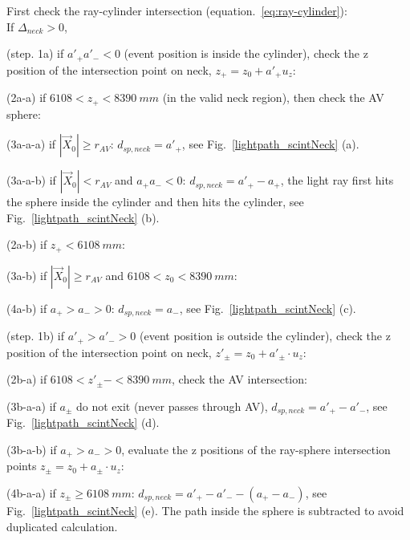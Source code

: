 \begin{algorithm}
	
	First check the ray-cylinder intersection (equation.~\ref{eq:ray-cylinder}):\\
	If {$\Delta_{neck}>0$}, 
	
	\hspace{2mm}(step. 1a) if $a'_+a'_-<0$ (event position is inside the cylinder), check the z position of the intersection point on neck, $z_+ = z_0 + a'_+u_z$: 
	
	\hspace{6mm}(2a-a) if $6108<z_+<8390~mm$ (in the valid neck region), then check the AV sphere:
	
	\hspace{8mm}(3a-a-a) if $|\vec{X}_0|\geq r_{AV}$: $d_{sp,neck}=a'_+$, see Fig.~\ref{lightpath_scintNeck} (a).
	
	\hspace{8mm}(3a-a-b) if $|\vec{X}_0|<r_{AV}$ and $a_+a_-<0$: $d_{sp,neck}=a'_+-a_+$, the light ray first hits the sphere inside the cylinder and then hits the cylinder, see Fig.~\ref{lightpath_scintNeck} (b). 
	
	\hspace{6mm}(2a-b) if $z_+<6108~mm$:
	
	\hspace{8mm}(3a-b) if $|\vec X_0|\geq r_{AV}$ and $6108<z_0<8390~mm$:
	
	\hspace{10mm}(4a-b) if $a_+>a_->0$: $d_{sp,neck}=a_-$, see Fig.~\ref{lightpath_scintNeck} (c).
	
	\hspace{2mm}(step. 1b) if $a'_+>a'_->0$ (event position is outside the cylinder), check the z position of the intersection point on neck, $z'_{\pm}=z_0+a'_\pm\cdot u_z$:
	
	\hspace{6mm}(2b-a) if $6108<z'_\pm-<8390~mm$, check the AV intersection:
	
	\hspace{8mm}(3b-a-a) if $a_\pm$ do not exit (never passes through AV), $d_{sp,neck}=a'_+ - a'_-$, see Fig.~\ref{lightpath_scintNeck} (d).
	
	\hspace{8mm}(3b-a-b) if $a_+>a_->0$, evaluate the z positions of the ray-sphere intersection points $z_\pm=z_0+a_\pm\cdot u_z$:
	
	\hspace{10mm}(4b-a-a) if $z_\pm\geq 6108~mm$: $d_{sp,neck}=a'_+ - a'_--(a_+-a_-)$, see Fig.~\ref{lightpath_scintNeck} (e). The path inside the sphere is subtracted to avoid duplicated calculation.
	

\end{algorithm}
